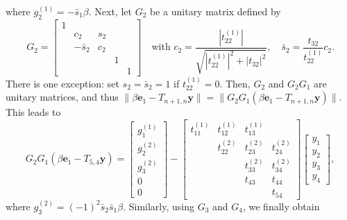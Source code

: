 {where $g_2^{(1)}=-\bar s_1\beta$. Next, let $G_2$ be a unitary matrix defined by}
\[G_2=\begin{bmatrix}1&&&&\\&c_2&s_2&&\\&-\bar s_2&c_2&&\\&&&1&\\&&&&1\end{bmatrix}
\quad\text{with }c_2=\frac{|t_{22}^{(1)}|}{\sqrt{|t_{22}^{(1)}|^2+|t_{32}|^2}},\quad\bar s_2=\frac{t_{32}}{t_{22}^{(1)}}c_2.\]
{There is one exception: set $s_2=\bar s_2=1$ if $t_{22}^{(1)}=0$. Then, $G_2$ and $G_2G_1$ are unitary matrices, and thus $\|\beta\bm e_1-T_{n+1,n}\bm y\|=\|G_2G_1(\beta\bm e_1-T_{n+1,n}\bm y)\|$. This leads to}
\[G_2G_1(\beta\bm e_1-T_{5,4}\bm y)=\begin{bmatrix}g_1^{(1)}\\g_2^{(2)}\\g_3^{(2)}\\0\\0\end{bmatrix}
-\begin{bmatrix}t_{11}^{(1)}&t_{12}^{(1)}&t_{13}^{(1)}&\\&t_{22}^{(2)}&t_{23}^{(2)}&t_{24}^{(2)}\\&&t_{33}^{(2)}&t_{34}^{(2)}\\&&t_{43}&t_{44}\\&&&t_{54}\end{bmatrix}\begin{bmatrix}y_1\\y_2\\y_3\\y_4\end{bmatrix},\]
{where $g_3^{(2)}=(-1)^2\bar s_2\bar s_1\beta$. Similarly, using $G_3$ and $G_4$, we finally obtain}
